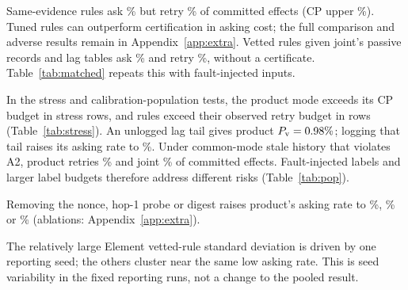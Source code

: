 Same-evidence rules ask \SimRulesAsk\% but retry \SimRulesPv\% of committed effects (CP upper \SimRulesPvHi\%).
Tuned rules can outperform certification in asking cost; the full comparison and adverse results remain in Appendix~\ref{app:extra}.
Vetted rules given joint's passive records and lag tables ask \SimModelVettedAsk\% and retry \SimModelVettedPv\%, without a certificate. Table~\ref{tab:matched} repeats this with fault-injected inputs.

In the stress and calibration-population tests, the product mode exceeds its CP budget in \StressNover{} stress rows, and rules exceed their observed retry budget in \StressRulesOver{} rows (Table~\ref{tab:stress}).
An unlogged lag tail gives product $P_{\mathrm v}=0.98\%$; logging that tail raises its asking rate to \StressLagCalAsk\%.
Under common-mode stale history that violates A2, product retries \PopCmCProd\% and joint \PopCmCJoint\% of committed effects.
Fault-injected labels and larger label budgets therefore address different risks (Table~\ref{tab:pop}).

Removing the nonce, hop-1 probe or digest raises product's asking rate to \SimNoNonceAsk\%, \SimNoHopAsk\% or \SimNoDigestAsk\% (ablations: Appendix~\ref{app:extra}).








The relatively large Element vetted-rule standard deviation is driven by one reporting seed; the others cluster near the same low asking rate. This is seed variability in the fixed reporting runs, not a change to the pooled result.











\clearpage


